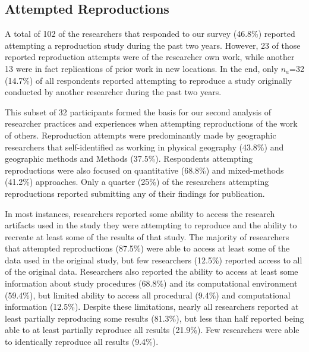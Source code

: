 \documentclass[]{interact}
\theoremstyle{plain}%
\theoremstyle{definition}
\theoremstyle{remark}
\begin{document}
\subsection*{Attempted Reproductions}
A total of 102 of the researchers that responded to our survey (46.8\%) reported attempting a reproduction study during the past two years.
However, 23 of those reported reproduction attempts were of the researcher own work, while another 13 were in fact replications of prior work in new locations.
In the end, only \textit{$n_{a}$}=32 (14.7\%) of all respondents reported attempting to reproduce a study originally conducted by another researcher during the past two years.

This subset of 32 participants formed the basis for our second analysis of researcher practices and experiences when attempting reproductions of the work of others.
Reproduction attempts were predominantly made by geographic researchers that self-identified as working in physical geography (43.8\%) and geographic methods and Methods (37.5\%).
Respondents attempting reproductions were also focused on quantitative (68.8\%) and mixed-methods (41.2\%) approaches. 
Only a quarter (25\%) of the researchers attempting reproductions reported submitting any of their findings for publication.

In most instances, researchers reported some ability to access the research artifacts used in the study they were attempting to reproduce and the ability to recreate at least some of the results of that study.  
The majority of researchers that attempted reproductions (87.5\%) were able to access at least some of the data used in the original study, but few researchers (12.5\%) reported access to all of the original data.
Researchers also reported the ability to access at least some information about study procedures (68.8\%) and its computational environment (59.4\%), but limited ability to access all procedural (9.4\%) and computational information (12.5\%). 
Despite these limitations, nearly all researchers reported at least partially reproducing some results (81.3\%), but less than half reported being able to at least partially reproduce all results (21.9\%).
Few researchers were able to identically reproduce all results (9.4\%).  
\end{document}
